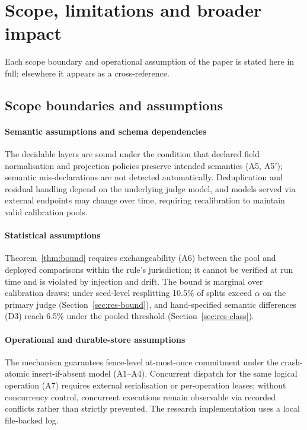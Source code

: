 \section{Scope, limitations and broader impact}\label{sec:limitations}

Each scope boundary and operational assumption of the paper is stated here in full; elsewhere it appears as a cross-reference.

\subsection{Scope boundaries and assumptions}

\paragraph{Semantic assumptions and schema dependencies}
The decidable layers are sound under the condition that declared field normalisation and projection policies preserve intended semantics (A5, A5$'$); semantic mis-declarations are not detected automatically. Deduplication and residual handling depend on the underlying judge model, and models served via external endpoints may change over time, requiring recalibration to maintain valid calibration pools.

\paragraph{Statistical assumptions} Theorem~\ref{thm:bound} requires exchangeability (A6) between the pool and deployed comparisons within the rule's jurisdiction; it cannot be verified at run time and is violated by injection and drift. The bound is marginal over calibration draws: under seed-level resplitting 10.5\% of splits exceed $\alpha$ on the primary judge (Section~\ref{sec:res-bound}), and hand-specified semantic differences (D3) reach 6.5\% under the pooled threshold (Section~\ref{sec:res-class}).

\paragraph{Operational and durable-store assumptions}
The mechanism guarantees fence-level at-most-once commitment under the crash-atomic insert-if-absent model (A1--A4). Concurrent dispatch for the same logical operation (A7) requires external serialisation or per-operation leases; without concurrency control, concurrent executions remain observable via recorded conflicts rather than strictly prevented. The research implementation uses a local file-backed log.

